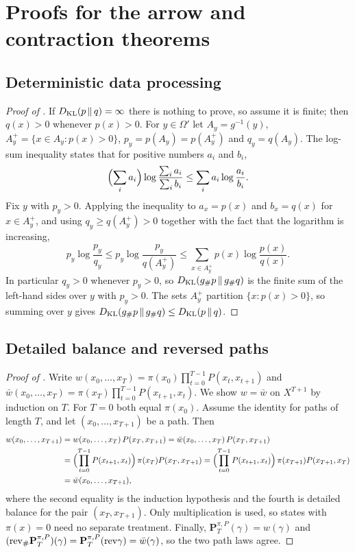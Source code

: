 \section{Proofs for the arrow and contraction theorems}\label{app:probkl}

\subsection{Deterministic data processing}

\begin{proof}[Proof of ]
If $D_{\mathrm{KL}}\!\left(p\,\middle\|\,q\right)=\infty$ there is nothing to prove, so assume it is finite; then $q(x)>0$ whenever $p(x)>0$.
For $y\in\Omega'$ let $A_y=g^{-1}(y)$, $A^+_y=\{x\in A_y:p(x)>0\}$, $p_y=p(A_y)=p(A_y^+)$ and $q_y=q(A_y)$.
The log-sum inequality \citep{CoverThomas2006} states that for positive numbers $a_i$ and $b_i$,
\[
  \Bigl(\sum_i a_i\Bigr)\log\frac{\sum_ia_i}{\sum_ib_i}\le\sum_i a_i\log\frac{a_i}{b_i}.
\]
Fix $y$ with $p_y>0$.
Applying the inequality to $a_x=p(x)$ and $b_x=q(x)$ for $x\in A^+_y$, and using $q_y\ge q(A^+_y)>0$ together with the fact that the logarithm is increasing,
\[
  p_y\log\frac{p_y}{q_y}\le p_y\log\frac{p_y}{q(A^+_y)}\le\sum_{x\in A^+_y}p(x)\log\frac{p(x)}{q(x)}.
\]
In particular $q_y>0$ whenever $p_y>0$, so $D_{\mathrm{KL}}\!\left(g_\#p\,\middle\|\,g_\#q\right)$ is the finite sum of the left-hand sides over $y$ with $p_y>0$.
The sets $A^+_y$ partition $\{x:p(x)>0\}$, so summing over $y$ gives $D_{\mathrm{KL}}\!\left(g_{\#}p\,\middle\|\,g_{\#}q\right)\le D_{\mathrm{KL}}\!\left(p\,\middle\|\,q\right)$.
\end{proof}

\subsection{Detailed balance and reversed paths}

\begin{proof}[Proof of ]
Write $w(x_0,\dots,x_T)=\pi(x_0)\prod_{t=0}^{T-1}P(x_t,x_{t+1})$ and $\bar w(x_0,\dots,x_T)=\pi(x_T)\prod_{t=0}^{T-1}P(x_{t+1},x_t)$.
We show $w=\bar w$ on $X^{T+1}$ by induction on $T$.
For $T=0$ both equal $\pi(x_0)$.
Assume the identity for paths of length $T$, and let $(x_0,\dots,x_{T+1})$ be a path.
Then
\begin{align*}
  w(x_0,\dots,x_{T+1})
  &=w(x_0,\dots,x_T)\,P(x_T,x_{T+1})
  =\bar w(x_0,\dots,x_T)\,P(x_T,x_{T+1})\\
  &=\Bigl(\prod_{t=0}^{T-1}P(x_{t+1},x_t)\Bigr)\,\pi(x_T)P(x_T,x_{T+1})
  =\Bigl(\prod_{t=0}^{T-1}P(x_{t+1},x_t)\Bigr)\,\pi(x_{T+1})P(x_{T+1},x_T)\\
  &=\bar w(x_0,\dots,x_{T+1}),
\end{align*}
where the second equality is the induction hypothesis and the fourth is detailed balance for the pair $(x_T,x_{T+1})$.
Only multiplication is used, so states with $\pi(x)=0$ need no separate treatment.
Finally, $\mathbf{P}^{\pi,P}_T(\gamma)=w(\gamma)$ and $(\mathrm{rev}_{\#}\mathbf{P}^{\pi,P}_T)(\gamma)=\mathbf{P}^{\pi,P}_T(\mathrm{rev}\gamma)=\bar w(\gamma)$, so the two path laws agree.
\end{proof}

